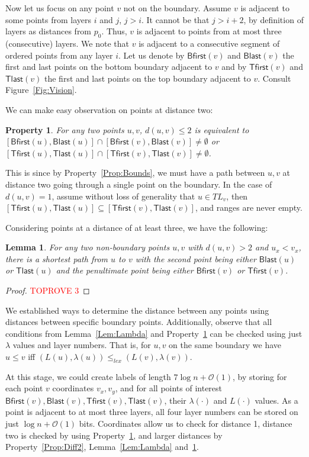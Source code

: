 \documentclass[a4paper,11pt]{article}
\newcommand{\Oh}{\mathcal{O}}
\newcommand{\lam}{\lambda}
\newcommand{\Blast}{\mathsf{Blast}}
\newcommand{\Bfirst}{\mathsf{Bfirst}}
\newcommand{\Tlast}{\mathsf{Tlast}}
\newcommand{\Tfirst}{\mathsf{Tfirst}}
\newtheorem{lemma}[theorem]{Lemma}
\newtheorem{property}[theorem]{Property}
\begin{document}
Now let us focus on any point $v$ not on the boundary.
Assume $v$ is adjacent to some points from layers $i$ and $j$, $j>i$.
It cannot be that $j>i+2$, by definition of layers as distances from $p_0$.
Thus, $v$ is adjacent to points from at most three (consecutive) layers.
We note that $v$ is adjacent to a consecutive segment of ordered points from any layer $i$.
Let us denote by $\Bfirst(v)$ and $\Blast(v)$ the first and last points on the bottom boundary adjacent to $v$
and by $\Tfirst(v)$ and $\Tlast(v)$ the first and last points on the top boundary adjacent to $v$.
Consult Figure~\ref{Fig:Vision}.

We can make easy observation on points at distance two:
\begin{property}
For any two points $u,v$, $d(u,v) \leq 2$ is equivalent to \newline $[\Bfirst(u),\Blast(u)] \cap [\Bfirst(v),\Blast(v)] \neq \emptyset$
or $[\Tfirst(u),\Tlast(u)] \cap [\Tfirst(v),\Tlast(v)] \neq \emptyset$.
\label{Prop:Dist2}
\end{property}
This is since by Property~\ref{Prop:Bounds}, we must have a path between $u,v$ at distance two going through a single point on the boundary.
In the case of $d(u,v)=1$, assume without loss of generality that $u \in TL_v$, then
$[\Tfirst(u),\Tlast(u)] \subseteq [\Tfirst(v),\Tlast(v)]$, and ranges are never empty.

Considering points at a distance of at least three, we have the following:
\begin{lemma}
For any two non-boundary points $u,v$ with $d(u,v)>2$ and $u_x<v_x$, there is a shortest path from $u$ to $v$ with the second point being
either $\Blast(u)$ or $\Tlast(u)$ and the penultimate point being either $\Bfirst(v)$ or $\Tfirst(v)$.
\label{Lem:Dist3}
\end{lemma}
\begin{proof}\textcolor{red}{TOPROVE 3}\end{proof}

We established ways to determine the distance between any points using distances between specific boundary points.
Additionally, observe that all conditions from Lemma~\ref{Lem:Lambda} and Property~\ref{Prop:Dist2}
can be checked using just $\lam$ values and layer numbers.
That is, for $u,v$ on the same boundary we have $u \leq v$ iff $(L(u),\lam(u)) \leq_{lex} (L(v),\lam(v))$. 

At this stage, we could create labels of length $7\log{n}+\Oh(1)$, by storing for each point $v$ coordinates 
$v_x,v_y$, and for all points of interest $\Bfirst(v),\Blast(v),\Tfirst(v),\Tlast(v)$, their $\lam(\cdot)$ and $L(\cdot)$ values.
As a point is adjacent to at most three layers, all four layer numbers can be stored on just $\log{n}+\Oh(1)$ bits.
Coordinates allow us to check for distance 1, distance two is checked by using Property~\ref{Prop:Dist2},
and larger distances by Property~\ref{Prop:Diff2}, Lemma~\ref{Lem:Lambda} and~\ref{Lem:Dist3}.
\end{document}
